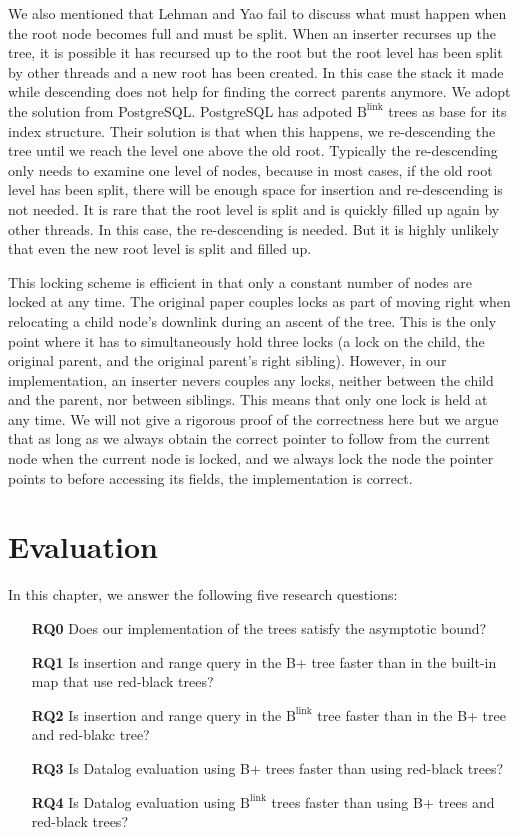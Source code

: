 \documentclass[twoside,11pt,openright]{report}
\theoremstyle{definition}
\begin{document}
We also mentioned that Lehman and Yao fail to discuss what must happen when the root node becomes full and must be split. When an inserter recurses up the tree, it is possible it has recursed up to the root but the root level has been split by other threads and a new root has been created. In this case the stack it made while descending does not help for finding the correct parents anymore. We adopt the solution from PostgreSQL. PostgreSQL has adpoted $\text{B}^{\text{link}}$ trees as base for its index structure. Their solution is that when this happens, we re-descending the tree until we reach the level one above the old root. Typically the re-descending only needs to examine one level of nodes, because in most cases, if the old root level has been split, there will be enough space for insertion and re-descending is not needed. It is rare that the root level is split and is quickly filled up again by other threads. In this case, the re-descending is needed. But it is highly unlikely that even the new root level is split and filled up.

This locking scheme is efficient in that only a constant number of nodes are locked at any time. The original paper couples locks as part of moving right when relocating a child node's downlink during an ascent of the tree.  This is the only point where it has to simultaneously hold three locks (a lock on the child, the original parent, and the original parent's right sibling). However, in our implementation, an inserter nevers couples any locks, neither between the child and the parent, nor between siblings. This means that only one lock is held at any time. We will not give a rigorous proof of the correctness here but we argue that as long as we always obtain the correct pointer to follow from the current node when the current node is locked, and we always lock the node the pointer points to before accessing its fields, the implementation is correct.


\chapter{Evaluation}
\label{ch:evaluation}

In this chapter, we answer the following five research questions:

\begin{itemize}
  \item[\textbf{RQ0}] Does our implementation of the trees satisfy the asymptotic bound?
  \item[\textbf{RQ1}] Is insertion and range query in the B+ tree faster than in the built-in map that use red-black trees?
  \item[\textbf{RQ2}] Is insertion and range query in the $\text{B}^{\text{link}}$ tree faster than in the B+ tree and red-blakc tree?
  \item[\textbf{RQ3}] Is Datalog evaluation using B+ trees faster than using red-black trees?
  \item[\textbf{RQ4}] Is Datalog evaluation using $\text{B}^{\text{link}}$ trees faster than using B+ trees and red-black trees?
\end{itemize}
\end{document}
